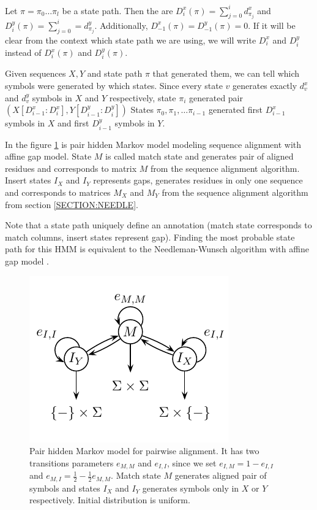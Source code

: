 \begin{definition}
Let $\pi=\pi_0\dots\pi_l$ be a state path. Then the  are
$D^x_i(\pi)=\sum_{j=0}^{i}d^x_{\pi_j}$ and $D^y_i(\pi)=\sum_{j=0}^{i}=d^y_{\pi_j}$.
Additionally, $D^x_{-1}(\pi)=D^y_{-1}(\pi)=0$. If it will be clear from the context
which state path we are using, we will write $D^x_i$ and $D^y_i$ instead of
$D^x_i(\pi)$ and $D^y_i(\pi)$.
\end{definition}

Given sequences $X,Y$ and state path $\pi$ that generated them, we 
can tell which symbols were generated by which states. Since every state $v$
generates exactly $d^x_v$ and $d^y_v$ symbols in $X$ and $Y$ respectively,
state $\pi_i$ generated pair $(X[D^x_{i-1}:D^x_{i}],Y[D^y_{i-1}:D^y_{i}])$
States $\pi_0,\pi_1,\dots\pi_{i-1}$ generated first $D^x_{i-1}$ symbols in $X$
and first $D^y_{i-1}$ symbols in $Y$. 


\begin{example}
In the figure \ref{FIGURE:SIMPLEPHMM} is pair hidden Markov model modeling
sequence alignment with affine gap model. State $M$ is called match state and
generates pair of aligned residues and corresponds to matrix $M$ from the sequence
alignment algorithm. Insert states $I_X$ and $I_Y$ represents gaps,
generates residues in only one sequence and corresponds to matrices $M_X$ and
$M_Y$ from the sequence alignment algorithm from section \ref{SECTION:NEEDLE}.

Note that a state path uniquely define an annotation (match state corresponds to
match columns, insert states represent gap).  Finding the most probable state
path for this HMM is equivalent to the Needleman-Wunsch algorithm with affine gap
model \cite{Durbin1998}.

\begin{figure}
\begin{center}
\includegraphics{../figures/pairHMM.pdf}
\end{center}
\caption[Simple pair HMM model for alignment]{Pair hidden Markov model for
pairwise alignment. It has two transitions
parameters $e_{M,M}$ and $e_{I,I}$, since we set $e_{I,M} = 1 - e_{I,I}$ and
$e_{M,I}=\frac12-\frac12e_{M,M}$. Match state $M$ generates aligned pair of symbols
and states $I_X$ and $I_Y$ generates symbols only in $X$ or $Y$ respectively.
Initial distribution is uniform.
}\label{FIGURE:SIMPLEPHMM}
\end{figure}

\end{example}

